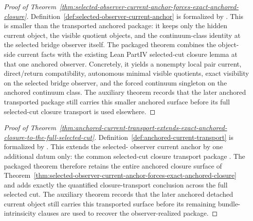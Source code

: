 \begin{proof}[Proof of Theorem~\ref{thm:selected-observer-current-anchor-forces-exact-anchored-closure}]
\label{proof:thm:selected-observer-current-anchor-forces-exact-anchored-closure}
Definition~\ref{def:selected-observer-current-anchor} is formalized by
. This is smaller than the transported
anchored package: it keeps only the hidden current object, the visible quotient
objects, and the continuum-class identity at the selected bridge observer
itself. The packaged theorem 
combines the object-side current facts with the existing Lean PartIV
selected-cut closure lemma  at that
one anchored
observer. Concretely, it yields a nonempty local pair current, direct/return
compatibility, autonomous minimal visible quotients, exact visibility on the
selected bridge observer, and the forced continuum singleton on the anchored
continuum class. The auxiliary theorem
 records that the
later anchored transported package still carries this smaller anchored surface
before its full selected-cut closure transport is used elsewhere.
\end{proof}

\begin{proof}[Proof of Theorem~\ref{thm:anchored-current-transport-extends-exact-anchored-closure-to-the-full-selected-cut}]
\label{proof:thm:anchored-current-transport-extends-exact-anchored-closure-to-the-full-selected-cut}
Definition~\ref{def:anchored-current-transport} is formalized by
. This extends the selected-
observer current anchor by one additional datum only: the common selected-cut
closure transport package . The packaged theorem
 therefore retains the
entire anchored closure surface of
Theorem~\ref{thm:selected-observer-current-anchor-forces-exact-anchored-closure}
and adds exactly the quantified closure-transport conclusion across the full
selected cut. The auxiliary theorem
 records that the
later anchored detached current object still carries this transported surface
before its remaining bundle-intrinsicity clauses are used to recover the
observer-realized package.
\end{proof}

